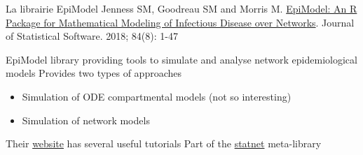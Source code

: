 \documentclass[aspectratio=43]{beamer}
\begin{document}
% 
% 
% 
% 
% 
% 
% 
% 
% 
% 
% 
% 
% 
% 
% 
% 
\begin{frame}{La librairie EpiModel}
Jenness SM, Goodreau SM and Morris M. \href{https://doi.org/10.18637\%2Fjss.v084.i08}{EpiModel: An R Package for Mathematical Modeling of Infectious Disease over Networks}. Journal of Statistical Software. 2018; 84(8): 1-47
\end{frame} 


\begin{frame}{EpiModel}
 library providing tools to simulate and analyse network epidemiological models
\vfill
Provides two types of approaches
\begin{itemize}
\item Simulation of ODE compartmental models (not so interesting)
\item Simulation of network models
\end{itemize}
\vfill
Their \href{https://www.epimodel.org}{website} has several useful tutorials
\vfill
Part of the \href{http://statnet.org/}{statnet} meta-library
\end{frame}
\end{document}
